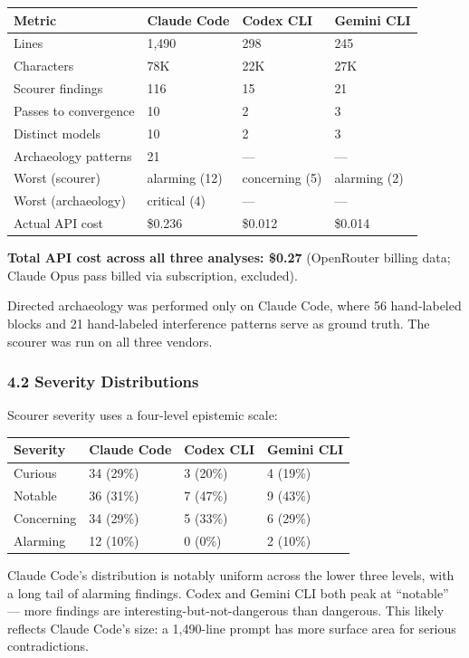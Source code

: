 \documentclass[
]{article}
\begin{document}
\begin{longtable}[]{@{}llll@{}}
\toprule\noalign{}
Metric & Claude Code & Codex CLI & Gemini CLI \\
\midrule\noalign{}
\endhead
\bottomrule\noalign{}
\endlastfoot
Lines & 1,490 & 298 & 245 \\
Characters & 78K & 22K & 27K \\
Scourer findings & 116 & 15 & 21 \\
Passes to convergence & 10 & 2 & 3 \\
Distinct models & 10 & 2 & 3 \\
Archaeology patterns & 21 & --- & --- \\
Worst (scourer) & alarming (12) & concerning (5) & alarming (2) \\
Worst (archaeology) & critical (4) & --- & --- \\
Actual API cost & \$0.236 & \$0.012 & \$0.014 \\
\end{longtable}

\textbf{Total API cost across all three analyses: \$0.27} (OpenRouter
billing data; Claude Opus pass billed via subscription, excluded).

Directed archaeology was performed only on Claude Code, where 56
hand-labeled blocks and 21 hand-labeled interference patterns serve as
ground truth. The scourer was run on all three vendors.

\hypertarget{severity-distributions}{%
\subsubsection{4.2 Severity
Distributions}\label{severity-distributions}}

Scourer severity uses a four-level epistemic scale:

\begin{longtable}[]{@{}llll@{}}
\toprule\noalign{}
Severity & Claude Code & Codex CLI & Gemini CLI \\
\midrule\noalign{}
\endhead
\bottomrule\noalign{}
\endlastfoot
Curious & 34 (29\%) & 3 (20\%) & 4 (19\%) \\
Notable & 36 (31\%) & 7 (47\%) & 9 (43\%) \\
Concerning & 34 (29\%) & 5 (33\%) & 6 (29\%) \\
Alarming & 12 (10\%) & 0 (0\%) & 2 (10\%) \\
\end{longtable}

Claude Code's distribution is notably uniform across the lower three
levels, with a long tail of alarming findings. Codex and Gemini CLI both
peak at ``notable'' --- more findings are interesting-but-not-dangerous
than dangerous. This likely reflects Claude Code's size: a 1,490-line
prompt has more surface area for serious contradictions.
\end{document}

